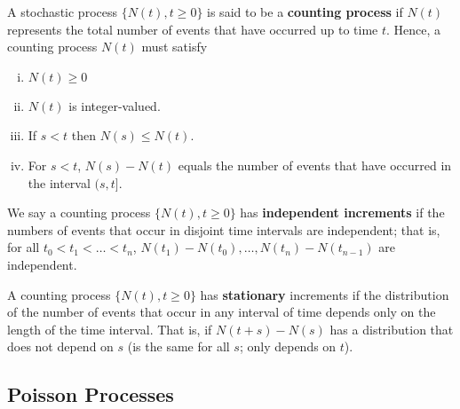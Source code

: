 \begin{definition}A stochastic process \(\{N(t), t \geq 0\}\) is said to be a \textbf{counting process} if \(N(t)\) represents the total number of events that have occurred up to time \(t\). Hence, a counting process \(N(t)\) must satisfy

\begin{enumerate}[(i)]

\item \(N(t) \geq 0\)

\item \(N(t)\) is integer-valued.

\item If \(s <t\) then \(N(s) \leq N(t)\).

\item For \(s < t\), \(N(s) -N(t)\) equals the number of events that have occurred in the interval \((s, t]\).

\end{enumerate}

\end{definition}

\begin{definition} We say a counting process \(\{N(t), t\geq0\}\) has \textbf{independent increments} if the numbers of events that occur in disjoint time intervals are independent; that is, for all \(t_0 < t_1 < \ldots < t_n\), \(  N(t_1) - N(t_0), \ldots, N(t_n) - N(t_{n-1})\) are independent. 

\end{definition}

\begin{definition} A counting process \(\{N(t) , t \geq 0 \}\) has \textbf{stationary} increments if the distribution of the number of events that occur in any interval of time depends only on the length of the time interval. That is, if \(N(t+s) - N(s)\) has a distribution that does not depend on \(s\) (is the same for all \(s\); only depends on \(t\)).

\end{definition}

\subsection{Poisson Processes}\label{stoch.pois.proc.sec}


